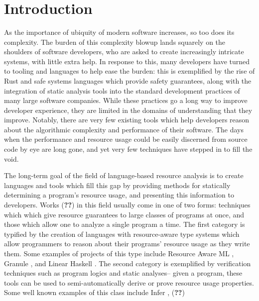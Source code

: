 \documentclass[draft]{westhesis}
\title{ }
\author{ }
\begin{document}
\mainmatter

\chapter{Introduction}
As the importance of ubiquity of modern software increases, so too does its complexity. The burden of this complexity blowup lands squarely on the shoulders of software developers, who are asked to create increasingly intricate systems, with little extra help. In response to this, many developers have turned to tooling and languages to help ease the burden: this is exemplified by the rise of Rust and safe systems languages \citehere which provide safety guarantees, along with the integration of static analysis tools into the standard development practices of many large software companies. While these practices go a long way to improve developer experience, they are limited in the domains of understanding that they improve. Notably, there are very few existing tools which help developers reason about the algorithmic complexity and performance of their software. The days when the performance and resource usage could be easily discerned from source code by eye are long gone, and yet very few techniques have stepped in to fill the void.

The long-term goal of the field of language-based resource analysis is to create languages and tools which fill this gap by providing methods for statically determining a program's resource usage, and presenting this information to developers. Works (\textbf{??}) in this field usually come in one of two forms: techniques which which give resource guarantees to large classes of programs at once, and those which allow one to analyze a single program a time. The first category is typified by the creation of languages with resource-aware type systems which allow programmers to reason about their programs' resource usage as they write them. Some examples of projects of this type include Resource Aware ML \citehere, Granule \citehere, and Linear Haskell \citehere.
The second category is exemplified by verification techniques such as program logics and static analyses-- given a program, these tools can be used to semi-automatically derive or prove resource usage properties. Some well known examples of this class include Infer \citehere, (\textbf{??})
\end{document}
